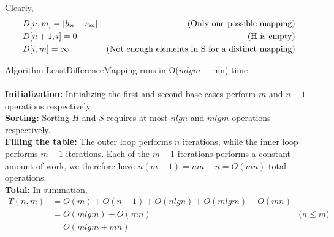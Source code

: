 \documentclass[12pt]{article}
\newenvironment{lemma}[2][Lemma]{\begin{trivlist}
\item[\hskip \labelsep {\bfseries #1}\hskip \labelsep {\bfseries #2.}]}{\end{trivlist}}
\newenvironment{question}[2][Question]{\begin{trivlist}
\item[\hskip \labelsep {\bfseries #1}\hskip \labelsep {\bfseries #2.}]}{\end{trivlist}}
\DeclarePairedDelimiter\abs{\lvert}{\rvert}%
\begin{document}
\begin{question}{2 (b)}
\begin{lemma}{2.1}
    Clearly,
    \begin{align*}
      & D[n, m] = \abs{h_{n} - s_{m}} & \text{(Only one possible mapping)} \\
      & D[n + 1, i] = 0 & \text{(H is empty)} \\
      & D[i, m] = \infty & \text{(Not enough elements in S for a distinct mapping)}
    \end{align*}
  \end{lemma}

  \begin{lemma}{2.2} Algorithm LeastDifferenceMapping runs in O($mlgm$ + mn) time
    \leavevmode \\ \\
    \textbf{Initialization:} Initializing the first and second base cases perform
    $m$ and $n - 1$ operations respectively. \\

    \textbf{Sorting:} Sorting $H$ and $S$ requires at most $nlgn$ and $mlgm$ operations
    respectively. \\

    \textbf{Filling the table:} The outer loop performs $n$ iterations, while the
    inner loop performs $m-1$ iterations.  Each of the $m-1$ iterations performs
    a constant amount of work, we therefore have $n(m-1) = nm - n = O(mn)$ total operations. \\

    \textbf{Total:} In summation,
    \begin{align*}
      T(n, m) & = O(m) + O(n - 1) + O(nlgn) + O(mlgm) + O(mn) & \\
           & = O(mlgm) + O(mn) & \text{($n \leq m$)} \\
           & = O(mlgm + mn) & \\
    \end{align*}
  \end{lemma}
\end{question}

\pagebreak
\end{document}
